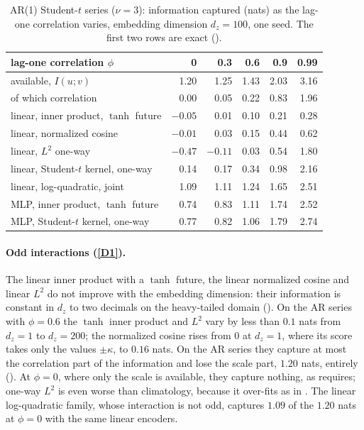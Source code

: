 \documentclass[11pt]{article}
\theoremstyle{plain}
\theoremstyle{definition}
\theoremstyle{remark}
\begin{document}
\begin{table}[ht]
 \centering
 \footnotesize
 \setlength{\tabcolsep}{4pt}
 \begin{tabular}{lrrrrr}
  \toprule
  lag-one correlation $\phi$ & 0 & 0.3 & 0.6 & 0.9 & 0.99 \\
  \midrule
  available, $I(u;v)$ & 1.20 & 1.25 & 1.43 & 2.03 & 3.16 \\
  \quad of which correlation & 0.00 & 0.05 & 0.22 & 0.83 & 1.96 \\
  \midrule
  linear, inner product, $\tanh$ future & $-0.05$ & 0.01 & 0.10 & 0.21 & 0.28 \\
  linear, normalized cosine & $-0.01$ & 0.03 & 0.15 & 0.44 & 0.62 \\
  linear, $L^2$ one-way & $-0.47$ & $-0.11$ & 0.03 & 0.54 & 1.80 \\
  linear, Student-$t$ kernel, one-way & 0.14 & 0.17 & 0.34 & 0.98 & 2.16 \\
  linear, log-quadratic, joint & 1.09 & 1.11 & 1.24 & 1.65 & 2.51 \\
  MLP, inner product, $\tanh$ future & 0.74 & 0.83 & 1.11 & 1.74 & 2.52 \\
  MLP, Student-$t$ kernel, one-way & 0.77 & 0.82 & 1.06 & 1.79 & 2.74 \\
  \bottomrule
 \end{tabular}
 \caption{AR(1) Student-$t$ series ($\nu=3$): information captured (nats) as
  the lag-one correlation varies, embedding dimension $d_z=100$, one seed.
  The first two rows are exact ().}
 \label{tab:arsweep}
\end{table}

\paragraph{Odd interactions (\ref{D1}).} The linear inner product with a
$\tanh$ future, the linear normalized cosine and linear $L^2$ do not improve
with the embedding dimension: their information is constant in $d_z$ to two
decimals on the heavy-tailed domain (). On the AR series
with $\phi=0.6$ the $\tanh$ inner product and $L^2$ vary by less than $0.1$
nats from $d_z=1$ to $d_z=200$; the normalized cosine rises from $0$ at
$d_z=1$, where its score takes only the values $\pm\kappa$, to $0.16$ nats.
On the AR series they capture at most the correlation part of the
information and lose the scale part, $1.20$ nats, entirely
(). At $\phi=0$, where only the scale is available,
they capture nothing, as  requires; one-way $L^2$ is even
worse than climatology, because it over-fits as in . The
linear log-quadratic family, whose interaction is not odd, captures $1.09$ of
the $1.20$ nats at $\phi=0$ with the same linear encoders.
\end{document}
